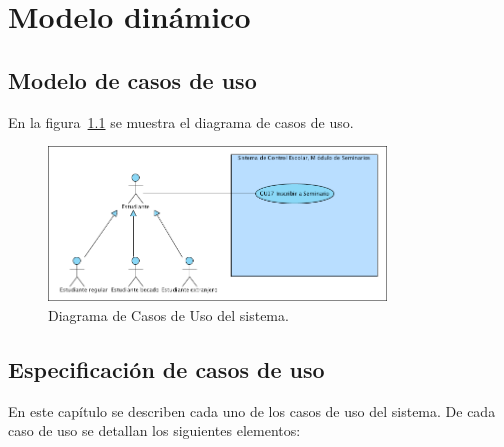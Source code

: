 \chapter{Modelo dinámico}

\section{Modelo de casos de uso}

	En la figura~\ref{fig:casosdeuso} se muestra el diagrama de casos de uso.

\begin{figure}[htbp!]
	\centering
		\includegraphics[width=0.8\textwidth]{images/CasosDeUso}
	\caption{Diagrama de Casos de Uso del sistema.}
	\label{fig:casosdeuso}
\end{figure}


\section{Especificación de casos de uso}

	En este capítulo se describen cada uno de los casos de uso del sistema. De cada caso de uso se detallan los siguientes elementos:\\
	

